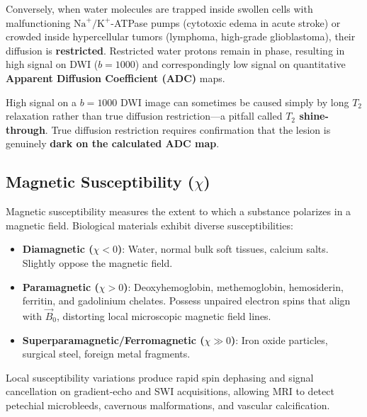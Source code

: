 \documentclass[11pt,a4paper]{article}
\begin{document}
Conversely, when water molecules are trapped inside swollen cells with malfunctioning $\text{Na}^+/\text{K}^+$-ATPase pumps (cytotoxic edema in acute stroke) or crowded inside hypercellular tumors (lymphoma, high-grade glioblastoma), their diffusion is \textbf{restricted}. Restricted water protons remain in phase, resulting in high signal on DWI ($b=1000$) and correspondingly low signal on quantitative \textbf{Apparent Diffusion Coefficient (ADC)} maps.

\begin{clinicalpearl}
High signal on a $b=1000$ DWI image can sometimes be caused simply by long $T_2$ relaxation rather than true diffusion restriction—a pitfall called \textbf{$T_2$ shine-through}. True diffusion restriction requires confirmation that the lesion is genuinely \textbf{dark on the calculated ADC map}.
\end{clinicalpearl}

\subsection{Magnetic Susceptibility ($\chi$)}
Magnetic susceptibility measures the extent to which a substance polarizes in a magnetic field. Biological materials exhibit diverse susceptibilities:
\begin{itemize}
    \item \textbf{Diamagnetic ($\chi < 0$)}: Water, normal bulk soft tissues, calcium salts. Slightly oppose the magnetic field.
    \item \textbf{Paramagnetic ($\chi > 0$)}: Deoxyhemoglobin, methemoglobin, hemosiderin, ferritin, and gadolinium chelates. Possess unpaired electron spins that align with $\vec{B}_0$, distorting local microscopic magnetic field lines.
    \item \textbf{Superparamagnetic/Ferromagnetic ($\chi \gg 0$)}: Iron oxide particles, surgical steel, foreign metal fragments.
\end{itemize}
Local susceptibility variations produce rapid spin dephasing and signal cancellation on gradient-echo and SWI acquisitions, allowing MRI to detect petechial microbleeds, cavernous malformations, and vascular calcification.
\end{document}
